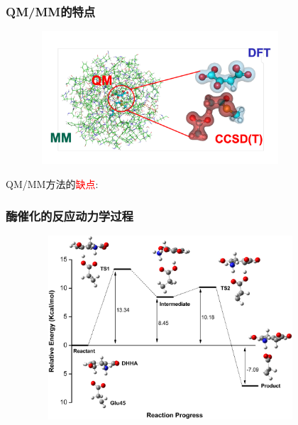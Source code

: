 \frame
{
	\frametitle{\textrm{QM/MM}的特点}
\begin{figure}[h!]
\centering
\vspace{-5.5pt}
\includegraphics[height=1.95in,width=3.70in,viewport=0 15 320 165,clip]{Figures/MM-QM-CCSD.jpg}
\label{MM-QM-CCSD}
\end{figure}
\textrm{QM/MM}方法的\textcolor{red}{缺点}:~
{\fontsize{6.0pt}{4.2pt}}
}

\frame
{
	\frametitle{酶催化的反应动力学过程}
\begin{figure}[h!]
\centering
\vspace{-10.5pt}
\includegraphics[height=2.70in,width=4.00in,viewport=0 0 500 370,clip]{Figures/Catalyst-reaction-path.png}
\label{enzyem-reaction-path-1}
\end{figure}
}

